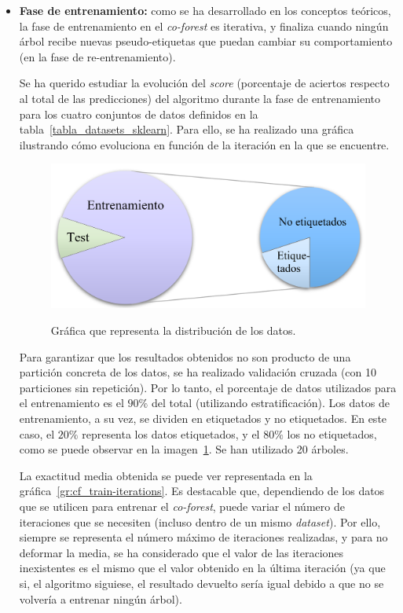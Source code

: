 \begin{itemize}
	\item \textbf{Fase de entrenamiento:} como se ha desarrollado en los conceptos teóricos, la fase de entrenamiento en el \textit{co-forest} es iterativa, y finaliza cuando ningún árbol recibe nuevas pseudo-etiquetas que puedan cambiar su comportamiento (en la fase de re-entrenamiento).
	
	Se ha querido estudiar la evolución del \textit{score} (porcentaje de aciertos respecto al total de las predicciones) del algoritmo durante la fase de entrenamiento para los cuatro conjuntos de datos definidos en la tabla~\ref{tabla_datasets_sklearn}. Para ello, se ha realizado una gráfica ilustrando cómo evoluciona en función de la iteración en la que se encuentre.
	
	\begin{figure}[h]
		\caption[\textit{Co-Forest}: distribución de datos entrenamiento y \textit{test}]{Gráfica que representa la distribución de los datos.}
		\centering
		\includegraphics[scale=0.3]{../img/memoria/5_entrenamiento_particiones}
		\label{5_entrenamiento_particiones}
	\end{figure}

	Para garantizar que los resultados obtenidos no son producto de una partición concreta de los datos, se ha realizado validación cruzada (con 10 particiones sin repetición). Por lo tanto, el porcentaje de datos utilizados para el entrenamiento es el $90\%$ del total (utilizando estratificación). Los datos de entrenamiento, a su vez, se dividen en etiquetados y no etiquetados. En este caso, el $20\%$ representa los datos etiquetados, y el $80\%$ los no etiquetados, como se puede observar en la imagen~\ref{5_entrenamiento_particiones}. Se han utilizado 20 árboles.
	
	La exactitud media obtenida se puede ver representada en la gráfica~\ref{gr:cf_train-iterations}. Es destacable que, dependiendo de los datos que se utilicen para entrenar el \textit{co-forest}, puede variar el número de iteraciones que se necesiten (incluso dentro de un mismo \textit{dataset}). Por ello, siempre se representa el número máximo de iteraciones realizadas, y para no deformar la media, se ha considerado que el valor de las iteraciones inexistentes es el mismo que el valor obtenido en la última iteración (ya que si, el algoritmo siguiese, el resultado devuelto sería igual debido a que no se volvería a entrenar ningún árbol).
	

\end{itemize}
